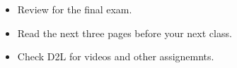 \begin{itemize}
\item Review for the final exam.
\item Read the next three pages before your next class.
\item Check D2L for videos and other assignemnts.
\end{itemize}
